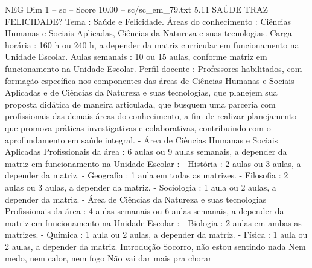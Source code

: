 \begin{textsample}{NEG Dim 1 – sc – Score 10.00 – sc/sc\_em\_79.txt}  \label{ex:f1_neg_279}
5.11 SAÚDE TRAZ FELICIDADE?
Tema : Saúde e Felicidade.
Áreas do conhecimento : Ciências Humanas e Sociais Aplicadas, Ciências da Natureza e suas tecnologias.
Carga horária : 160 h ou 240 h, a depender da matriz curricular em funcionamento na Unidade Escolar.
Aulas semanais : 10 ou 15 aulas, conforme matriz em funcionamento na Unidade Escolar.
Perfil docente : Professores habilitados, com formação específica nos componentes das áreas de Ciências Humanas e Sociais Aplicadas e de Ciências da Natureza e suas tecnologias, que planejem sua proposta didática de maneira articulada, que busquem uma parceria com profissionais das demais áreas do conhecimento, a fim de realizar planejamento que promova práticas investigativas e colaborativas, contribuindo com o aprofundamento em saúde integral. - Área de Ciências Humanas e Sociais Aplicadas Profissionais da área : 6 aulas ou 9 aulas semanais, a depender da matriz em funcionamento na Unidade Escolar : - História : 2 aulas ou 3 aulas, a depender da matriz. - Geografia : 1 aula em todas as matrizes. - Filosofia : 2 aulas ou 3 aulas, a depender da matriz. - Sociologia : 1 aula ou 2 aulas, a depender da matriz. - Área de Ciências da Natureza e suas tecnologias Profissionais da área : 4 aulas semanais ou 6 aulas semanais, a depender da matriz em funcionamento na Unidade Escolar : - Biologia : 2 aulas em ambas as matrizes. - Química : 1 aula ou 2 aulas, a depender da matriz. - Física : 1 aula ou 2 aulas, a depender da matriz.
Introdução Socorro, não estou sentindo nada Nem medo, nem calor, nem fogo Não vai dar mais pra chorar

\end{textsample}
